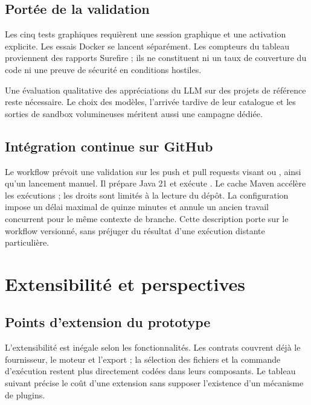 \subsection{Portée de la validation}
Les cinq tests graphiques requièrent une session graphique et une activation explicite. Les essais Docker se lancent séparément. Les compteurs du tableau proviennent des rapports Surefire ; ils ne constituent ni un taux de couverture du code ni une preuve de sécurité en conditions hostiles.

Une évaluation qualitative des appréciations du LLM sur des projets de référence reste nécessaire. Le choix des modèles, l'arrivée tardive de leur catalogue et les sorties de sandbox volumineuses méritent aussi une campagne dédiée.

\subsection{Intégration continue sur GitHub}
Le workflow  prévoit une validation sur les push et pull requests visant  ou , ainsi qu'un lancement manuel. Il prépare Java 21 et exécute . Le cache Maven accélère les exécutions ; les droits sont limités à la lecture du dépôt. La configuration impose un délai maximal de quinze minutes et annule un ancien travail concurrent pour le même contexte de branche. Cette description porte sur le workflow versionné, sans préjuger du résultat d'une exécution distante particulière.

\clearpage
\section{Extensibilité et perspectives}
\label{sec:extensions}
\subsection{Points d'extension du prototype}
L'extensibilité est inégale selon les fonctionnalités. Les contrats couvrent déjà le fournisseur, le moteur et l'export ; la sélection des fichiers et la commande d'exécution restent plus directement codées dans leurs composants. Le tableau suivant précise le coût d'une extension sans supposer l'existence d'un mécanisme de plugins.

